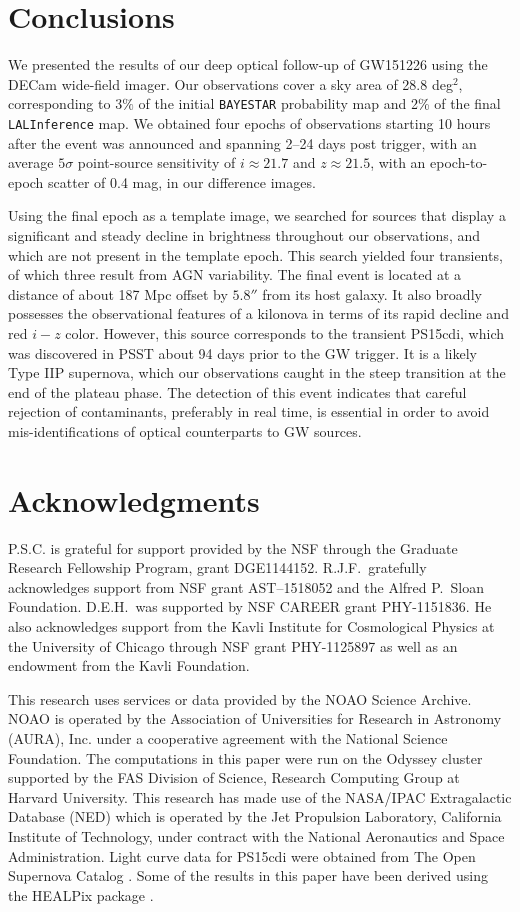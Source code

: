 \section{Conclusions}
\label{sec:conc}
We presented the results of our deep optical follow-up of 
GW151226 using the DECam wide-field
imager. Our observations cover a sky area of 28.8 deg$^2$,
corresponding to $3\%$ of the initial {\tt BAYESTAR} probability map
and 2\% of the final {\tt LALInference} map. We obtained
four epochs of observations starting 10 hours after the 
event was announced and spanning 2--24 days post
trigger, with an average $5\sigma$ point-source sensitivity of 
$i\approx21.7$ and $z\approx21.5$, with an epoch-to-epoch scatter
of 0.4 mag, in our difference images.
 
Using the final epoch as a template image, we searched for sources
that display a significant and steady decline in brightness
throughout our observations, and which are not present in the template
epoch. This search yielded four transients, of which three result from
 AGN variability. The final event is located at a distance of about
187 Mpc offset by $5.8''$ from its host galaxy. It also broadly possesses the
observational features of a kilonova in terms of its rapid decline and
red $i-z$ color. However, this source corresponds to the transient
PS15cdi, which was discovered in PSST about 94 days prior to the GW
trigger. It is a likely Type IIP supernova, which our observations
caught in the steep transition at the end of the plateau phase. The
detection of this event indicates that careful rejection of
contaminants, preferably in real time, is essential in order to avoid
mis-identifications of optical counterparts to GW sources.

\section*{Acknowledgments}
P.S.C. is grateful for support provided by the NSF
through the Graduate Research Fellowship Program, grant DGE1144152.
R.J.F.\ gratefully acknowledges support from NSF grant AST--1518052 and 
the Alfred P.\ Sloan Foundation. D.E.H.\ was supported by NSF CAREER grant 
PHY-1151836. He also acknowledges support from the Kavli Institute for  
Cosmological Physics at the University of Chicago through NSF grant  
PHY-1125897 as well as an endowment from the Kavli Foundation.

This research uses services or data provided by the NOAO Science 
Archive. NOAO is operated by the Association of Universities for
Research in Astronomy (AURA), Inc. under a cooperative agreement with
the National Science Foundation. The computations in this paper were
run on the Odyssey cluster supported by the FAS Division of Science,
Research Computing Group at Harvard University. This research has made
use of the NASA/IPAC Extragalactic Database (NED) which is operated by
the Jet Propulsion Laboratory, California Institute of Technology,
under contract with the National Aeronautics and Space Administration.
Light curve data for PS15cdi were obtained from The Open Supernova
Catalog \citep{openSN}. Some of the results in this paper have been 
derived using the HEALPix package \citep{gorski+05}.

